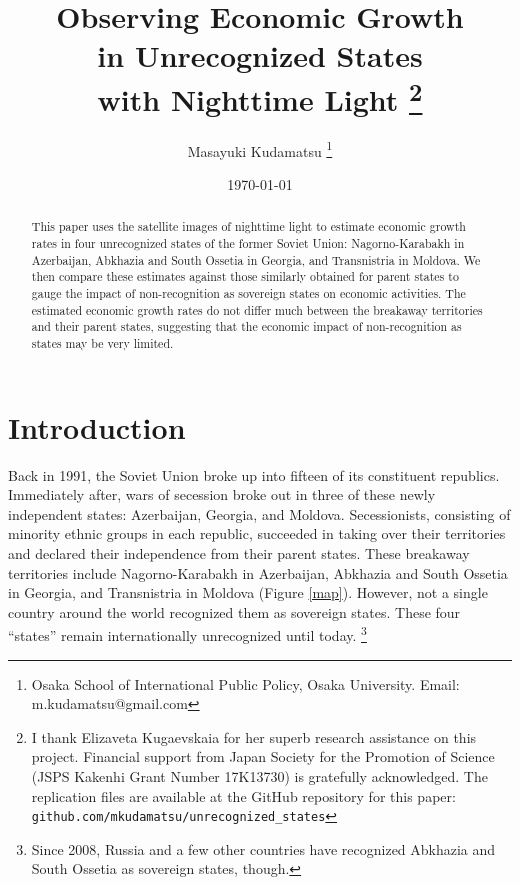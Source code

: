\documentclass[12pt,a4paper]{article}%
\begin{document}
\cprotect\title{
	Observing Economic Growth \\in Unrecognized States \\with Nighttime Light 
	\cprotect\thanks{%
		I thank Elizaveta Kugaevskaia for her superb research assistance on this project. 
		Financial support from Japan Society for the Promotion of Science (JSPS Kakenhi Grant Number 17K13730) is gratefully acknowledged. 
		The replication files are available at the GitHub repository for this paper: \verb!github.com/mkudamatsu/unrecognized_states!
		} 
	}
\author{Masayuki Kudamatsu \thanks{Osaka School of International Public Policy, Osaka University. Email: m.kudamatsu@gmail.com}}
\date{\today}
\maketitle

\begin{abstract}
This paper uses the satellite images of nighttime light to estimate economic growth rates in four unrecognized states of the former Soviet Union: Nagorno-Karabakh in Azerbaijan, Abkhazia and South Ossetia in Georgia, and Transnistria in Moldova. We then compare these estimates against those similarly obtained for parent states to gauge the impact of non-recognition as sovereign states on economic activities. The estimated economic growth rates do not differ much between the breakaway territories and their parent states, suggesting that the economic impact of non-recognition as states may be very limited.
\end{abstract}

\newpage

\section{Introduction}
Back in 1991, the Soviet Union broke up into fifteen of its constituent republics. 
Immediately after, wars of secession broke out in three of these newly independent states: Azerbaijan, Georgia, and Moldova.
Secessionists, consisting of minority ethnic groups in each republic, succeeded in taking over their territories and declared their independence from their parent states. 
These breakaway territories include Nagorno-Karabakh in Azerbaijan, Abkhazia and South Ossetia in Georgia, and Transnistria in Moldova (Figure \ref{map}). 
However, not a single country around the world recognized them as sovereign states. 
These four ``states'' remain internationally unrecognized until today.%
\footnote{%
	Since 2008, Russia and a few other countries have recognized Abkhazia and South Ossetia as sovereign states, though.
} 
\end{document}
